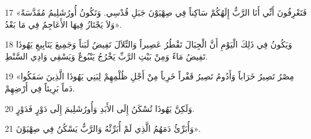 \par 17 «فَتَعْرِفُونَ أَنِّي أَنَا الرَّبُّ إِلَهُكُمْ سَاكِناً فِي صِهْيَوْنَ جَبَلِ قُدْسِي. وَتَكُونُ أُورُشَلِيمُ مُقَدَّسَةً وَلاَ يَجْتَازُ فِيهَا الأَعَاجِمُ فِي مَا بَعْدُ».
\par 18 وَيَكُونُ فِي ذَلِكَ الْيَوْمِ أَنَّ الْجِبَالَ تَقْطُرُ عَصِيراً وَالتِّلاَلَ تَفِيضُ لَبَناً وَجَمِيعَ يَنَابِيعِ يَهُوذَا تَفِيضُ مَاءً وَمِنْ بَيْتِ الرَّبِّ يَخْرُجُ يَنْبُوعٌ وَيَسْقِي وَادِي السَّنْطِ.
\par 19 «مِصْرُ تَصِيرُ خَرَاباً وَأَدُومُ تَصِيرُ قَفْراً خَرِباً مِنْ أَجْلِ ظُلْمِهِمْ لِبَنِي يَهُوذَا الَّذِينَ سَفَكُوا دَماً بَرِيئاً فِي أَرْضِهِمْ.
\par 20 وَلَكِنَّ يَهُوذَا تُسْكَنُ إِلَى الأَبَدِ وَأُورُشَلِيمَ إِلَى دَوْرٍ فَدَوْرٍ.
\par 21 وَأُبَرِّئُ دَمَهُمُ الَّذِي لَمْ أُبَرِّئْهُ وَالرَّبُّ يَسْكُنُ فِي صِهْيَوْنَ».


